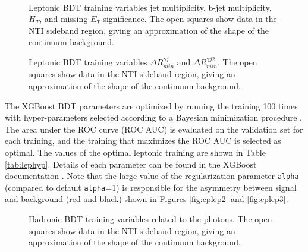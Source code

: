 \begin{figure}[htbp]
  \centering
	 \\
  \caption{Leptonic BDT training variables jet multiplicity, b-jet multiplicity, $H_{T}$, and missing $E_{T}$ significance.  The open squares show data in the NTI sideband region, giving an approximation of the shape of the continuum background. }
  \label{fig:lepvbls6}
\end{figure}

\begin{figure}[htbp]
  \centering
  \caption{Leptonic BDT training variables $\Delta R_{min}^{\gamma j}$ and $\Delta R_{min}^{\gamma j2}$.  The open squares show data in the NTI sideband region, giving an approximation of the shape of the continuum background. }
  \label{fig:lepvbls7}
\end{figure}

\clearpage

The XGBoost BDT parameters are optimized by running the training 100 times with hyper-parameters selected according to a Bayesian minimization procedure \cite{skopt}. The area under the ROC curve (ROC AUC) is evaluated on the validation set for each training, and the training that maximizes the ROC AUC is selected as optimal. The values of the optimal leptonic training are shown in Table \ref{tab:lephyp}. Details of each parameter can be found in the XGBoost documentation \cite{xgboost}. Note that the large value of the regularization parameter \texttt{alpha} (compared to default \texttt{alpha}=1) is responsible for the asymmetry between signal and background (red and black) shown in Figures \ref{fig:cplep2} and \ref{fig:cplep3}.

\begin{figure}[htbp]
  \centering
  \caption{Hadronic BDT training variables related to the photons.  The open squares show data in the NTI sideband region, giving an approximation of the shape of the continuum background. }
  \label{fig:hadvbls1}
\end{figure}

